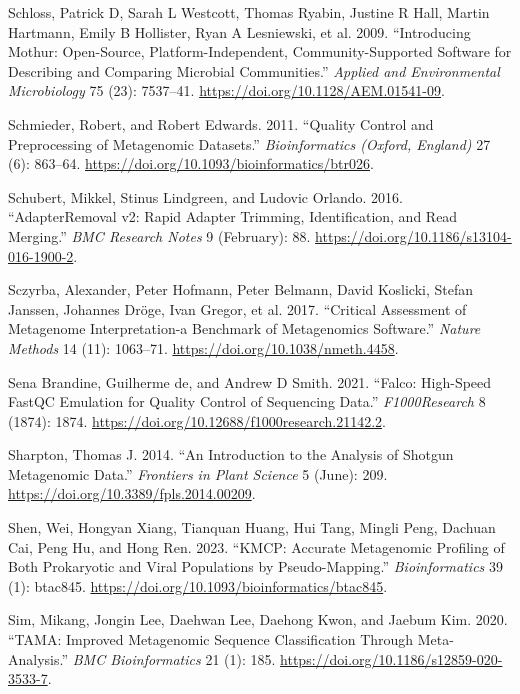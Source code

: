\documentclass[
]{article}
\newlength{\cslhangindent}
\newlength{\cslentryspacingunit} %
\newenvironment{CSLReferences}[2] %
 {%
  \setlength{\parindent}{0pt}
  \ifodd #1
  \let\oldpar\par
  \def\par{\hangindent=\cslhangindent\oldpar}
  \fi
  \setlength{\parskip}{#2\cslentryspacingunit}
 }%
 {}
\begin{document}
\begin{CSLReferences}{1}{0}
\leavevmode{}%
Schloss, Patrick D, Sarah L Westcott, Thomas Ryabin, Justine R Hall,
Martin Hartmann, Emily B Hollister, Ryan A Lesniewski, et al. 2009.
{``Introducing Mothur: Open-Source, Platform-Independent,
Community-Supported Software for Describing and Comparing Microbial
Communities.''} \emph{Applied and Environmental Microbiology} 75 (23):
7537--41. \url{https://doi.org/10.1128/AEM.01541-09}.

\leavevmode{}%
Schmieder, Robert, and Robert Edwards. 2011. {``Quality Control and
Preprocessing of Metagenomic Datasets.''} \emph{Bioinformatics (Oxford,
England)} 27 (6): 863--64.
\url{https://doi.org/10.1093/bioinformatics/btr026}.

\leavevmode{}%
Schubert, Mikkel, Stinus Lindgreen, and Ludovic Orlando. 2016.
{``{AdapterRemoval} {v2}: Rapid Adapter Trimming, Identification, and
Read Merging.''} \emph{BMC Research Notes} 9 (February): 88.
\url{https://doi.org/10.1186/s13104-016-1900-2}.

\leavevmode{}%
Sczyrba, Alexander, Peter Hofmann, Peter Belmann, David Koslicki, Stefan
Janssen, Johannes Dröge, Ivan Gregor, et al. 2017. {``Critical
Assessment of Metagenome Interpretation-a Benchmark of Metagenomics
Software.''} \emph{Nature Methods} 14 (11): 1063--71.
\url{https://doi.org/10.1038/nmeth.4458}.

\leavevmode{}%
Sena Brandine, Guilherme de, and Andrew D Smith. 2021. {``Falco:
High-Speed {FastQC} Emulation for Quality Control of Sequencing Data.''}
\emph{F1000Research} 8 (1874): 1874.
\url{https://doi.org/10.12688/f1000research.21142.2}.

\leavevmode{}%
Sharpton, Thomas J. 2014. {``An Introduction to the Analysis of Shotgun
Metagenomic Data.''} \emph{Frontiers in Plant Science} 5 (June): 209.
\url{https://doi.org/10.3389/fpls.2014.00209}.

\leavevmode{}%
Shen, Wei, Hongyan Xiang, Tianquan Huang, Hui Tang, Mingli Peng, Dachuan
Cai, Peng Hu, and Hong Ren. 2023. {``{KMCP}: Accurate Metagenomic
Profiling of Both Prokaryotic and Viral Populations by
Pseudo-Mapping.''} \emph{Bioinformatics} 39 (1): btac845.
\url{https://doi.org/10.1093/bioinformatics/btac845}.

\leavevmode{}%
Sim, Mikang, Jongin Lee, Daehwan Lee, Daehong Kwon, and Jaebum Kim.
2020. {``{TAMA}: Improved Metagenomic Sequence Classification Through
Meta-Analysis.''} \emph{BMC Bioinformatics} 21 (1): 185.
\url{https://doi.org/10.1186/s12859-020-3533-7}.


\end{CSLReferences}
\end{document}
